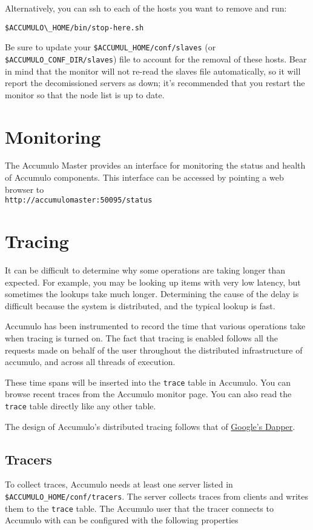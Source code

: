 Alternatively, you can ssh to each of the hosts you want to remove and run:

\begingroup\fontsize{8pt}{8pt}\selectfont\begin{verbatim}
$ACCUMULO\_HOME/bin/stop-here.sh
\end{verbatim}\endgroup

Be sure to update your \texttt{\$ACCUMUL\_HOME/conf/slaves} (or \texttt{\$ACCUMULO\_CONF\_DIR/slaves}) file to 
account for the removal of these hosts. Bear in mind that the monitor will not re-read the 
slaves file automatically, so it will report the decomissioned servers as down; it's 
recommended that you restart the monitor so that the node list is up to date.

\section{Monitoring}

The Accumulo Master provides an interface for monitoring the status and health of
Accumulo components. This interface can be accessed by pointing a web browser to\\
\texttt{http://accumulomaster:50095/status}

\section{Tracing}
It can be difficult to determine why some operations are taking longer
than expected. For example, you may be looking up items with very low
latency, but sometimes the lookups take much longer. Determining the
cause of the delay is difficult because the system is distributed, and
the typical lookup is fast.

Accumulo has been instrumented to record the time that various
operations take when tracing is turned on. The fact that tracing is
enabled follows all the requests made on behalf of the user throughout
the distributed infrastructure of accumulo, and across all threads of
execution.

These time spans will be inserted into the \texttt{trace} table in
Accumulo. You can browse recent traces from the Accumulo monitor
page. You can also read the \texttt{trace} table directly like any
other table.

The design of Accumulo's distributed tracing follows that of
\href{http://research.google.com/pubs/pub36356.html}{Google's Dapper}.

\subsection{Tracers}
To collect traces, Accumulo needs at least one server listed in
\\\texttt{\$ACCUMULO\_HOME/conf/tracers}. The server collects traces
from clients and writes them to the \texttt{trace} table. The Accumulo
user that the tracer connects to Accumulo with can be configured with
the following properties

